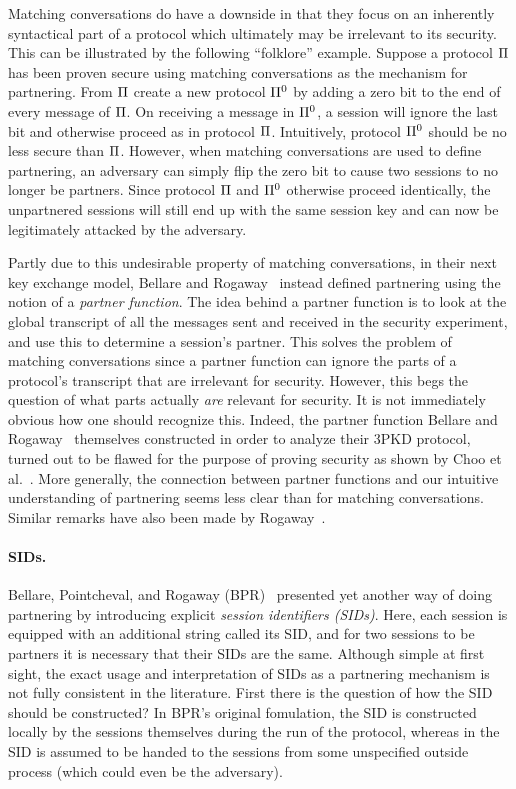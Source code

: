 Matching conversations do have a downside in that they focus on an inherently syntactical part of a protocol
which ultimately may be irrelevant to its security.
This can be illustrated by the following ``folklore'' example.
Suppose a protocol $\mathrm{\Pi}$ has been proven secure using matching conversations as the mechanism for partnering.
From $\mathrm{\Pi}$ create a new protocol $\mathrm{\Pi}^0$ by adding a zero bit to the end of every message of $\mathrm{\Pi}$.
On receiving a message in $\mathrm{\Pi}^0$,
a session will ignore the last bit and otherwise proceed as in protocol $\mathrm{\Pi}$.
Intuitively,
protocol $\mathrm{\Pi}^0$ should be no less secure than $\mathrm{\Pi}$.
However,
when matching conversations are used to define partnering,
an adversary can simply flip the zero bit to cause two sessions to no longer be partners.
Since protocol $\mathrm{\Pi}$ and $\mathrm{\Pi}^0$ otherwise proceed identically,
the unpartnered sessions will still end up with the same session key and can now  be legitimately attacked by the adversary.

Partly due to this undesirable property of matching conversations,
in their next key exchange model,
Bellare and Rogaway~\cite{STOC:BelRog95} instead defined partnering using the notion of a \emph{partner function}. 
The idea behind a partner function is to look at the global transcript of all the messages sent and received in the security experiment,
and use this to determine a session's partner.
This solves the problem of matching conversations since a partner function can ignore the parts of a protocol's transcript that are irrelevant for security.
However,
this begs the question of what parts actually \emph{are} relevant for security.
It is not immediately obvious how one should recognize this. 
Indeed,
the partner function  Bellare and Rogaway~\cite{STOC:BelRog95} themselves constructed in order to analyze their 3PKD protocol, turned out to be flawed for the purpose of proving security
as shown by Choo et al.~\cite{SCN:CBHM04,ACISP:ChoHit05}.
More generally,
the connection between partner functions and our intuitive understanding of partnering seems less clear than for matching conversations.
Similar remarks have also been made by Rogaway~\cite[§6]{Rogaway:2004:role_of_definitions}.


\paragraph{SIDs.}
Bellare, Pointcheval, and Rogaway (BPR)~\cite{EC:BelPoiRog00} presented  yet another way of doing partnering by introducing explicit \emph{session identifiers (SIDs)}.
Here,
each session is equipped with an additional string called its SID,
and for two sessions to be partners it is necessary that their SIDs are the same. 
Although simple at first sight,
the exact usage and interpretation of SIDs as a partnering mechanism is not fully consistent in the literature.
First there is the question of how the SID should be constructed?
In BPR's original fomulation,
the SID is constructed locally by the sessions themselves during the run of the protocol,
whereas in \cite{EC:CanKra01,C:CanKra02} the SID is assumed to be handed to the sessions from some unspecified outside process (which could even be the adversary).

